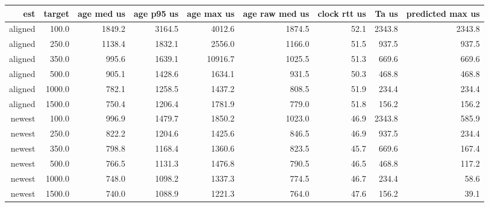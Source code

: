 \begin{tabular}{@{}rrrrrrrrr@{}}
\toprule
est & target & age med us & age p95 us & age max us & age raw med us & clock rtt us & Ta us & predicted max us \\
\midrule
aligned & 100.0 & 1849.2 & 3164.5 & 4012.6 & 1874.5 & 52.1 & 2343.8 & 2343.8 \\
aligned & 250.0 & 1138.4 & 1832.1 & 2556.0 & 1166.0 & 51.5 & 937.5 & 937.5 \\
aligned & 350.0 & 995.6 & 1639.1 & 10916.7 & 1025.5 & 51.3 & 669.6 & 669.6 \\
aligned & 500.0 & 905.1 & 1428.6 & 1634.1 & 931.5 & 50.3 & 468.8 & 468.8 \\
aligned & 1000.0 & 782.1 & 1258.5 & 1437.2 & 808.5 & 51.9 & 234.4 & 234.4 \\
aligned & 1500.0 & 750.4 & 1206.4 & 1781.9 & 779.0 & 51.8 & 156.2 & 156.2 \\
newest & 100.0 & 996.9 & 1479.7 & 1850.2 & 1023.0 & 46.9 & 2343.8 & 585.9 \\
newest & 250.0 & 822.2 & 1204.6 & 1425.6 & 846.5 & 46.9 & 937.5 & 234.4 \\
newest & 350.0 & 798.8 & 1168.4 & 1360.6 & 823.5 & 45.7 & 669.6 & 167.4 \\
newest & 500.0 & 766.5 & 1131.3 & 1476.8 & 790.5 & 46.5 & 468.8 & 117.2 \\
newest & 1000.0 & 748.0 & 1098.2 & 1337.3 & 774.5 & 46.7 & 234.4 & 58.6 \\
newest & 1500.0 & 740.0 & 1088.9 & 1221.3 & 764.0 & 47.6 & 156.2 & 39.1 \\
\bottomrule
\end{tabular}
